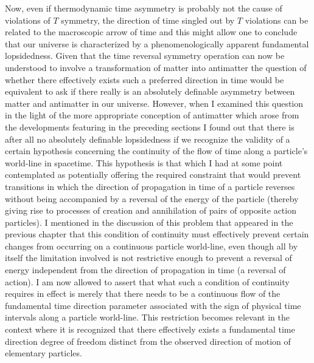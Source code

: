 \documentclass[notitlepage,12pt]{report}
\begin{document}
Now, even if thermodynamic time asymmetry is probably not the cause of violations of $T$ symmetry, the direction of time singled out by $T$ violations can be related to the macroscopic arrow of time and this might allow one to conclude that our universe is characterized by a phenomenologically apparent fundamental lopsidedness. Given that the time reversal symmetry operation can now be understood to involve a transformation of matter into antimatter the question of whether there effectively exists such a preferred direction in time would be equivalent to ask if there really is an absolutely definable asymmetry between matter and antimatter in our universe. However, when I examined this question in the light of the more appropriate conception of antimatter which arose from the developments featuring in the preceding sections I found out that there is after all no absolutely definable lopsidedness if we recognize the validity of a certain hypothesis concerning the continuity of the flow of time along a particle's world-line in spacetime. This hypothesis is that which I had at some point contemplated as potentially offering the required constraint that would prevent transitions in which the direction of propagation in time of a particle reverses without being accompanied by a reversal of the energy of the particle (thereby giving rise to processes of creation and annihilation of pairs of opposite action particles). I mentioned in the discussion of this problem that appeared in the previous chapter that this condition of continuity must effectively prevent certain changes from occurring on a continuous particle world-line, even though all by itself the limitation involved is not restrictive enough to prevent a reversal of energy independent from the direction of propagation in time (a reversal of action). I am now allowed to assert that what such a condition of continuity requires in effect is merely that there needs to be a continuous flow of the fundamental time direction parameter associated with the sign of physical time intervals along a particle world-line. This restriction becomes relevant in the context where it is recognized that there effectively exists a fundamental time direction degree of freedom distinct from the observed direction of motion of elementary particles.
\end{document}

